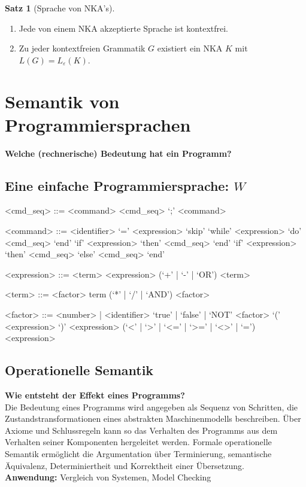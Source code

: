 \documentclass{scrreprt}
\theoremstyle{definition}
\newtheorem{Satz}{Satz}[section]
\theoremstyle{example}
\theoremstyle{algorithm}
\begin{document}
\begin{Satz}[Sprache von NKA's]
\noindent
\begin{enumerate}[1)]
\item
Jede von einem NKA akzeptierte Sprache ist kontextfrei.
\item
Zu jeder kontextfreien Grammatik $G$ existiert ein NKA $K$ mit ${L(G)=L_\varepsilon(K)}$.
\end{enumerate}
\end{Satz}

\chapter{Semantik von Programmiersprachen}
{\Large\textbf{\textsf{Welche (rechnerische) Bedeutung hat ein Programm?}}}

\section{Eine einfache Programmiersprache: $W$}
\setlength{\grammarindent}{3cm} %
\begin{grammar}
<cmd_seq> ::= <command>
\alt <cmd_seq> `;' <command>

<command> ::= <identifier> `=' <expression>
\alt `skip'
\alt `while' <expression> `do' <cmd_seq> `end'
\alt `if' <expression> `then' <cmd_seq> `end'
\alt `if' <expression> `then' <cmd_seq> `else' <cmd_seq> `end'

<expression> ::= <term>
\alt <expression> (`+' | `-' | `OR') <term>

<term> ::= <factor>
\alt term (`*'  | `/' | `AND') <factor>

<factor> ::= <number> | <identifier>
\alt `true' | `false' | `NOT' <factor>
\alt `(' <expression> `)'
\alt <expression> (`<' | `>' | `<=' | `>=' | `<>' | `=') <expression>
\end{grammar}

\section{Operationelle Semantik}
\textbf{\textsf{Wie entsteht der Effekt eines Programms?}}\\
Die Bedeutung eines Programms wird angegeben als Sequenz von Schritten, die Zustandstransformationen eines abstrakten Maschinenmodells beschreiben. Über Axiome und Schlussregeln kann so das Verhalten des Programms aus dem Verhalten seiner Komponenten hergeleitet werden. Formale operationelle Semantik ermöglicht die Argumentation über Terminierung, semantische Äquivalenz, Determiniertheit und Korrektheit einer Übersetzung.\\
\textbf{Anwendung:} Vergleich von Systemen, Model Checking
\end{document}
